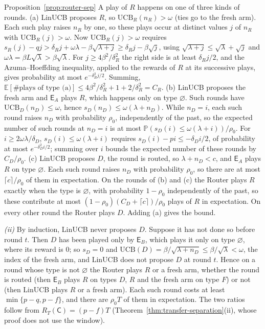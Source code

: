 \documentclass[anon]{alt2027} %
\newcommand{\Prb}{\mathbb{P}}
\newcommand{\E}{\mathbb{E}}
\newcommand{\Cold}{\mathsf{C}}
\newcommand{\Exp}{\mathsf{E}}
\begin{document}
\begin{proofof}{Proposition~\ref{prop:router-sep}}
A play of $R$ happens on one of three kinds of rounds. (a) LinUCB proposes
$R$, so $\mathrm{UCB}_R(n_R)>\omega$ (ties go to the fresh arm). Each such play
raises $n_R$ by one, so these plays occur at distinct values $j$ of $n_R$ with
$\mathrm{UCB}_R(j)>\omega$. Now $\mathrm{UCB}_R(j)>\omega$ requires
$s_R(j)-qj>\delta_Rj+\omega\lambda-\beta\sqrt{\lambda+j}\ge\delta_Rj-\beta\sqrt j$,
using $\sqrt{\lambda+j}\le\sqrt\lambda+\sqrt j$ and
$\omega\lambda=\beta L\sqrt\lambda>\beta\sqrt\lambda$. For
$j\ge4\beta^2/\delta_R^2$ the right side is at least $\delta_Rj/2$, and the
Azuma--Hoeffding inequality, applied to the rewards of $R$ at its successive
plays, gives probability at most $e^{-\delta_R^2j/2}$. Summing,
$\E[\#\text{plays of type (a)}]\le4\beta^2/\delta_R^2+1+2/\delta_R^2=C_R$.
(b) LinUCB proposes the fresh arm and $\Exp_A$ plays $R$, which happens
only on type $\varnothing$. Such rounds have $\mathrm{UCB}_D(n_D)\le\omega$,
hence $s_D(n_D)\le\omega(\lambda+n_D)$. While $n_D=i$, each such round raises
$n_D$ with probability $\rho_0$, independently of the past, so the expected
number of such rounds at $n_D=i$ is at most
$\Prb(s_D(i)\le\omega(\lambda+i))/\rho_0$. For $i\ge2\omega\lambda/\delta_D$,
$s_D(i)\le\omega(\lambda+i)$ requires $s_D(i)-pi\le-\delta_Di/2$, of
probability at most $e^{-\delta_D^2i/2}$; summing over $i$ bounds the expected
number of these rounds by $C_D/\rho_0$. (c) LinUCB proposes $D$, the round is
routed, so $\lambda+n_D<c$, and $\Exp_A$ plays $R$ on type $\varnothing$. Each
such round raises $n_D$ with probability $\rho_0$, so there are at most
$\lceil c\rceil/\rho_0$ of them in expectation. On the rounds of (b) and
(c) the Router plays $R$ exactly when the type is $\varnothing$, with
probability $1-\rho_0$ independently of the past, so these contribute at most
$(1-\rho_0)(C_D+\lceil c\rceil)/\rho_0$ plays of $R$ in expectation. On every
other round the Router plays $D$. Adding (a) gives the bound.

\emph{(ii)} By induction, LinUCB never proposes $D$. Suppose it has not done
so before round $t$. Then $D$ has been played only by $\Exp_B$, which plays
it only on type $\varnothing$, where its reward is $0$; so $s_D=0$ and
$\mathrm{UCB}(D)=\beta/\sqrt{\lambda+n_D}\le\beta/\sqrt\lambda<\omega$, the index
of the fresh arm, and LinUCB does not propose $D$ at round $t$. Hence on a
round whose type is not $\varnothing$ the Router plays $R$ or a fresh arm,
whether the round is routed (then $\Exp_B$ plays $R$ on types $D$, $R$ and the
fresh arm on type $F$) or not (then LinUCB plays $R$ or a fresh arm). Each
such round costs at least $\min\{p-q,p-f\}$, and there are $\rho_0T$ of them
in expectation. The two ratios follow from $R_T(\Cold)=(p-f)T$
(Theorem~\ref{thm:transfer-separation}(ii), whose proof does not use the
window).
\end{proofof}
\end{document}
